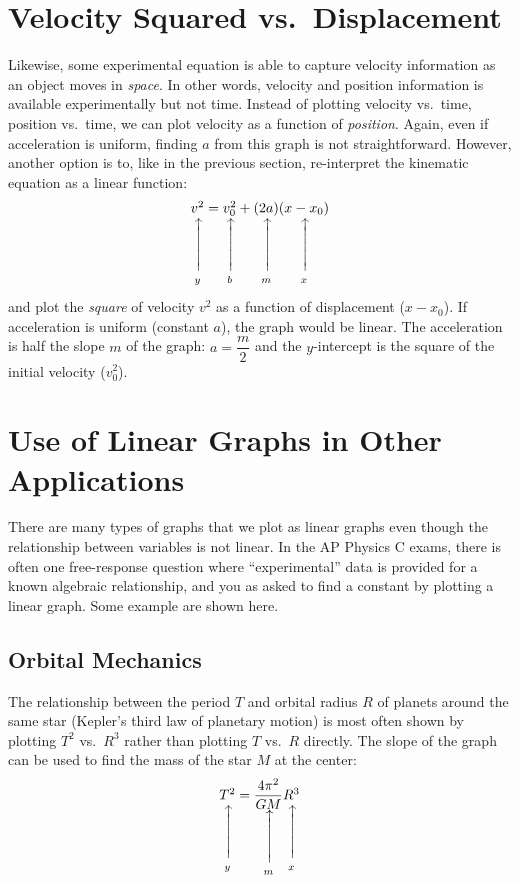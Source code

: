 \documentclass{../../oss-handout}
\makeatletter
\newcommand\vertarrowbox[2]{%
    \begin{array}[t]{@{}c@{}} #1 \\
    \rotatebox{90}{$\xrightarrow{\hphantom{abcdefgh}}$} \\[-1ex]
    \mathclap{\scriptstyle\text{#2}}%
    \end{array}}
\makeatother
\begin{document}
\section{Velocity Squared vs.\ Displacement}
Likewise, some experimental equation is able to capture velocity information
as an object moves in \emph{space}. In other words, velocity and position
information is available experimentally but not time. Instead of plotting
velocity vs.\ time, position vs.\ time, we can plot velocity as a function of
\emph{position}. Again, even if acceleration is uniform, finding $a$ from this
graph is not straightforward. However, another option is to, like in the
previous section, re-interpret the kinematic equation as a linear function:
\begin{equation}
  \vertarrowbox{v^2}{$y$}=
  \vertarrowbox{v_0^2}{$b$}+\vertarrowbox{(2a)}{$m$}
  \vertarrowbox{(x-x_0)}{$x$}
\end{equation}
and plot the \emph{square} of velocity $v^2$ as a function of
displacement ($x-x_0$). If acceleration is uniform (constant $a$), the graph
would be linear. The acceleration is half the slope $m$ of the graph:
$a=\dfrac m2$ and the $y$-intercept is the square of the initial velocity
($v_0^2$).

\section{Use of Linear Graphs in Other Applications}
There are many types of graphs that we plot as linear graphs even though the
relationship between variables is not linear. In the AP Physics C exams, there
is often one free-response question where ``experimental'' data is provided for
a known algebraic relationship, and you as asked to find a constant by plotting
a linear graph. Some example are shown here.

\subsection{Orbital Mechanics}
The relationship between the period $T$ and orbital radius $R$ of planets
around the same star (Kepler's third law of planetary motion) is most often
shown by plotting $T^2$ vs.\ $R^3$ rather than plotting $T$ vs.\ $R$ directly.
The slope of the graph can be used to find the mass of the star $M$
at the center:
\begin{equation}
  \vertarrowbox{T^2}{$y$}=
  \vertarrowbox{\dfrac{4\pi^2}{GM}}{$m$}
  \vertarrowbox{R^3}{$x$}
\end{equation}
\end{document}
